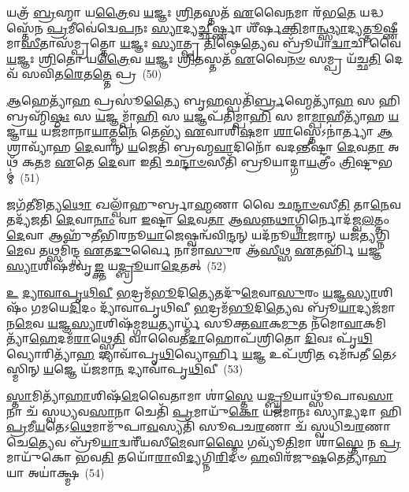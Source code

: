 𑌯𑌤𑍍𑌰᳴ \ul{𑌬𑍍𑌰}\-𑌹𑍍𑌮𑌾 𑌯\-\ul{𑌤𑍍𑌰𑍈}\-𑌵 \ul{𑌯}\-𑌜𑍍𑌞𑌃 \ul{𑌶𑍍𑌰𑌿}\-𑌤𑌸𑍍𑌤𑌤᳴ \ul{𑌏}\-𑌵𑍈\-\ul{𑌨}\-𑌮𑌾 𑌰᳴𑌭\-\ul{𑌤𑍇} 𑌯𑌦𑍍𑌧𑌸𑍍𑌤𑍇᳴𑌨 \ul{𑌪𑍍𑌰}\-𑌮𑍀𑌵𑍇॑𑌦𑍍𑌵𑍇\-\ul{𑌪}\-𑌨𑌃 \ul{𑌸𑍍𑌯𑌾}\-𑌦𑍍𑌯\-\ul{𑌚𑍍𑌛𑍀}\-𑌰𑍍𑌷𑍍𑌣𑌾 𑌶𑍀᳴𑌰𑍍\mbox{}𑌷\-\ul{𑌕𑍍𑌤𑌿}\-𑌮𑌾\-\ul{𑌨𑍍𑌥𑍍𑌸𑍍𑌯𑌾}\-𑌦𑍍𑌯\-\ul{𑌤𑍍𑌤𑍂}\-𑌷𑍍𑌣𑍀𑌮𑌾\-\ul{𑌸𑍀}\-𑌤𑌾𑌸᳴𑌮𑍍𑌪𑍍𑌰𑌤𑍍𑌤𑍋 \ul{𑌯}\-𑌜𑍍𑌞𑌃 \ul{𑌸𑍍𑌯𑌾}\-𑌤𑍍𑌪𑍍𑌰 \ul{𑌤𑌿}\-𑌷𑍍𑌠𑍇\-\ul{𑌤𑍍𑌯𑍇}\-𑌵 𑌬𑍍𑌰𑍂᳴𑌯𑌾\-\ul{𑌦𑍍𑌵𑌾}\-𑌚𑌿 𑌵𑍈 \ul{𑌯}\-𑌜𑍍𑌞𑌃 \ul{𑌶𑍍𑌰𑌿}\-𑌤𑍋 𑌯\-\ul{𑌤𑍍𑌰𑍈}\-𑌵 \ul{𑌯}\-𑌜𑍍𑌞𑌃 \ul{𑌶𑍍𑌰𑌿}\-𑌤𑌸𑍍𑌤𑌤᳴ \ul{𑌏}\-𑌵𑍈\-\ul{𑌨}\-\-\ul{𑍞} 𑌸𑌮𑍍𑌪𑍍𑌰 𑌯᳴𑌚𑍍𑌛\-\ul{𑌤𑌿} 𑌦𑍇𑌵᳴ 𑌸𑌵𑌿𑌤\-\ul{𑌰𑍇}\-𑌤\-\ul{𑌤𑍍𑌤𑍇} 𑌪𑍍𑌰~(50)

\-\ul{𑌆}\-𑌹𑍇𑌤𑍍𑌯𑌾᳴\-\ul{𑌹} 𑌪𑍍𑌰𑌸𑍂॑\-\ul{𑌤𑍍𑌯𑍈} 𑌬𑍃\-\ul{𑌹}\-𑌸𑍍𑌪𑌤𑌿᳴\-\ul{𑌰𑍍𑌬𑍍𑌰}\-𑌹𑍍𑌮𑍇𑌤𑍍𑌯𑌾᳴\-\ul{𑌹} 𑌸 𑌹𑌿 𑌬𑍍𑌰𑌹𑍍𑌮𑌿᳴\-\ul{𑌷𑍍𑌠𑌃} 𑌸 \ul{𑌯}\-𑌜𑍍𑌞𑌮𑍍𑌪𑌾᳴\-\ul{𑌹𑌿} 𑌸 \ul{𑌯}\-𑌜𑍍𑌞𑌪᳴𑌤𑌿𑌮𑍍𑌪𑌾\-\ul{𑌹𑌿} 𑌸 𑌮𑌾\-\ul{𑌮𑍍𑌪𑌾}\-𑌹𑍀𑌤𑍍𑌯𑌾᳴𑌹 \ul{𑌯}\-𑌜𑍍𑌞𑌾\-\ul{𑌯} 𑌯𑌜᳴𑌮𑌾𑌨𑌾\-\ul{𑌯𑌾}\-𑌤𑍍𑌮\-\ul{𑌨𑍇} 𑌤𑍇𑌭𑍍𑌯᳴ \ul{𑌏}\-𑌵𑌾𑌶𑌿\-\ul{𑌷}\-𑌮𑌾 \ul{𑌶𑌾}\-𑌸𑍍𑌤𑍇\-𑌽𑌨𑌾॑𑌰𑍍𑌤𑍍𑌯𑌾 \ul{𑌆}\-𑌶𑍍𑌰𑌾𑌵𑍍𑌯𑌾᳴𑌹 \ul{𑌦𑍇}\-𑌵𑌾𑌨𑍍 \ul{𑌯}\-𑌜𑍇𑌤𑌿᳴ 𑌬𑍍𑌰𑌹𑍍𑌮\-\ul{𑌵𑌾}\-𑌦𑌿𑌨𑍋᳴ 𑌵𑌦\-\ul{𑌨𑍍𑌤𑍀}\-𑌷𑍍𑌟𑌾 \ul{𑌦𑍇}\-𑌵\-\ul{𑌤𑌾} 𑌅𑌥᳴ 𑌕\-\ul{𑌤}\-𑌮 \ul{𑌏}\-𑌤𑍇 \ul{𑌦𑍇}\-𑌵𑌾 𑌇\-\ul{𑌤𑌿} 𑌛\-\ul{𑌨𑍍𑌦𑌾}\-\-\ul{𑍞}\-𑌸𑍀𑌤𑌿᳴ 𑌬𑍍𑌰𑍂𑌯𑌾𑌦𑍍𑌗𑌾\-\ul{𑌯}\-𑌤𑍍𑌰𑍀𑌂 \ul{𑌤𑍍𑌰𑌿}\-𑌷𑍍𑌟𑍁𑌭𑌮𑍍॑~(51)

𑌜𑌗᳴\-\ul{𑌤𑍀}\-𑌮𑌿𑌤𑍍𑌯\-\ul{𑌥𑍋} 𑌖𑌲𑍍𑌵𑌾᳴𑌹𑍁𑌰𑍍𑌬𑍍𑌰𑌾\-\ul{𑌹𑍍𑌮}\-𑌣𑌾 𑌵𑍈 𑌛\-\ul{𑌨𑍍𑌦𑌾}\-\-\ul{𑍞}\-𑌸𑍀\-\ul{𑌤𑌿} 𑌤𑌾\-\ul{𑌨𑍇}\-𑌵 𑌤𑌦𑍍𑌯᳴𑌜𑌤𑌿 \ul{𑌦𑍇}\-𑌵𑌾\-\ul{𑌨𑌾𑌂} 𑌵𑌾 \ul{𑌇}\-𑌷𑍍𑌟𑌾 \ul{𑌦𑍇}\-𑌵\-\ul{𑌤𑌾} 𑌆\-\ul{𑌸}\-𑌨𑍍𑌨\-\ul{𑌥𑌾}\-𑌗𑍍𑌨𑌿𑌰𑍍𑌨𑍋𑌦᳴𑌜𑍍𑌵\-\ul{𑌲}\-𑌤𑍍𑌤𑌂 \ul{𑌦𑍇}\-𑌵𑌾 𑌆𑌹𑍁᳴𑌤𑍀𑌭𑌿𑌰𑌨𑍂\-\ul{𑌯𑌾}\-𑌜𑍇𑌷𑍍𑌵𑌨𑍍𑌵᳴𑌵𑌿\-\ul{𑌨𑍍𑌦}\-𑌨𑍍 𑌯𑌦᳴𑌨𑍂\-\ul{𑌯𑌾}\-𑌜𑌾𑌨𑍍 𑌯𑌜᳴\-\ul{𑌤𑍍𑌯}\-𑌗𑍍𑌨𑌿\-\ul{𑌮𑍇}\-𑌵 𑌤𑌥𑍍𑌸𑌮𑌿᳴𑌨𑍍𑌦𑍍𑌧 \ul{𑌏}\-𑌤\-\ul{𑌦𑍁}\-𑌰𑍍𑌵𑍈 𑌨𑌾𑌮𑌾᳴\-\ul{𑌸𑍁}\-𑌰 𑌆᳴\-\ul{𑌸𑍀}\-𑌥𑍍𑌸 \ul{𑌏}\-𑌤𑌰𑍍\mbox{}𑌹𑌿᳴ \ul{𑌯}\-𑌜𑍍𑌞\-\ul{𑌸𑍍𑌯𑌾}\-𑌶𑌿𑌷᳴𑌮𑌵𑍃\-\ul{𑌙𑍍𑌕𑍍𑌤} 𑌯\-\ul{𑌦𑍍𑌬𑍍𑌰𑍂}\-𑌯𑌾\-\ul{𑌦𑍇}\-𑌤𑌤𑍍~(52)

\-\ul{𑌉} \ul{𑌦𑍍𑌯𑌾}\-\-\ul{𑌵𑌾}\-\-\ul{𑌪𑍃}\-\-\ul{𑌥𑌿}\-\-\ul{𑌵𑍀} \ul{𑌭}\-𑌦𑍍𑌰𑌮᳴\-\ul{𑌭𑍂}\-𑌦𑌿\-\ul{𑌤𑍍𑌯𑍇}\-𑌤𑌦𑍁᳴\-\ul{𑌮𑍇}\-𑌵𑌾\-\ul{𑌸𑍁}\-𑌰𑌂 \ul{𑌯}\-𑌜𑍍𑌞\-\ul{𑌸𑍍𑌯𑌾}\-𑌶𑌿𑌷𑌂᳴ 𑌗𑌮𑌯𑍇\-\ul{𑌦𑌿}\-𑌦𑌂 𑌦𑍍𑌯𑌾᳴𑌵𑌾𑌪𑍃𑌥𑌿𑌵𑍀 \ul{𑌭}\-𑌦𑍍𑌰𑌮᳴\-\ul{𑌭𑍂}\-𑌦𑌿\-\ul{𑌤𑍍𑌯𑍇}\-𑌵 𑌬𑍍𑌰𑍂᳴\-\ul{𑌯𑌾}\-𑌦𑍍𑌯𑌜᳴𑌮𑌾𑌨\-\ul{𑌮𑍇}\-𑌵 \ul{𑌯}\-𑌜𑍍𑌞\-\ul{𑌸𑍍𑌯𑌾}\-𑌶𑌿𑌷᳴𑌮𑍍𑌗𑌮\-\ul{𑌯}\-𑌤𑍍𑌯𑌾𑌰𑍍𑌧𑍍𑌮᳴ 𑌸𑍂𑌕𑍍𑌤\-\ul{𑌵𑌾}\-𑌕\-\ul{𑌮𑍁}\-𑌤 𑌨᳴𑌮𑍋\-\ul{𑌵𑌾}\-𑌕𑌮𑌿𑌤𑍍𑌯𑌾᳴\-\ul{𑌹𑍇}\-𑌦𑌮᳴\-\ul{𑌰𑌾}\-𑌥𑍍𑌸𑍍𑌮𑍇\-\ul{𑌤𑌿} 𑌵𑌾𑌵𑍈𑌤\-\ul{𑌦𑌾}\-𑌹𑍋𑌪᳴𑌶𑍍𑌰𑌿𑌤𑍋 \ul{𑌦𑌿}\-𑌵𑌃 𑌪𑍃᳴\-\ul{𑌥𑌿}\-𑌵𑍍𑌯𑍋𑌰𑌿𑌤𑍍𑌯𑌾᳴\-\ul{𑌹} 𑌦𑍍𑌯𑌾𑌵𑌾᳴𑌪𑍃\-\ul{𑌥𑌿}\-𑌵𑍍𑌯𑍋𑌰𑍍\mbox{}𑌹𑌿 \ul{𑌯}\-𑌜𑍍𑌞 𑌉𑌪᳴𑌶𑍍𑌰𑌿\-\ul{𑌤} 𑌓𑌮᳴𑌨𑍍𑌵𑌤𑍀 \ul{𑌤𑍇}\-\-𑌽𑌸𑍍𑌮𑌿𑌨𑍍 \ul{𑌯}\-𑌜𑍍𑌞𑍇 𑌯᳴𑌜𑌮𑌾\-\ul{𑌨} 𑌦𑍍𑌯𑌾𑌵𑌾᳴𑌪𑍃\-\ul{𑌥𑌿}\-𑌵𑍀~(53)

\-\ul{𑌸𑍍𑌤𑌾}\-𑌮𑌿𑌤𑍍𑌯𑌾᳴\-\ul{𑌹𑌾}\-𑌶𑌿𑌷᳴\-\ul{𑌮𑍇}\-𑌵𑍈𑌤𑌾𑌮𑌾 𑌶𑌾॑\-\ul{𑌸𑍍𑌤𑍇} 𑌯\-\ul{𑌦𑍍𑌬𑍍𑌰𑍂}\-𑌯𑌾𑌥𑍍𑌸𑍂᳴𑌪𑌾𑌵\-\ul{𑌸𑌾}\-𑌨𑌾 𑌚᳴ 𑌸𑍍𑌵𑌧𑍍𑌯𑌵\-\ul{𑌸𑌾}\-𑌨𑌾 𑌚𑍇𑌤𑌿᳴ \ul{𑌪𑍍𑌰}\-𑌮𑌾𑌯𑍁᳴\-\ul{𑌕𑍋} 𑌯𑌜᳴𑌮𑌾𑌨𑌃 𑌸𑍍𑌯𑌾\-\ul{𑌦𑍍𑌯}\-𑌦𑌾 𑌹𑌿 \ul{𑌪𑍍𑌰}\-𑌮𑍀\-\ul{𑌯}\-𑌤𑍇\-𑌽\-\ul{𑌥𑍇}\-𑌮𑌾𑌮𑍁᳴𑌪𑌾\-\ul{𑌵}\-𑌸𑍍𑌯𑌤𑌿᳴ 𑌸𑍂𑌪𑌚\-\ul{𑌰}\-𑌣𑌾 𑌚᳴ 𑌸𑍍𑌵𑌧𑌿𑌚\-\ul{𑌰}\-𑌣𑌾 𑌚𑍇\-\ul{𑌤𑍍𑌯𑍇}\-𑌵 𑌬𑍍𑌰𑍂᳴\-\ul{𑌯𑌾}\-𑌦𑍍𑌵𑌰𑍀᳴𑌯𑌸𑍀\-\ul{𑌮𑍇}\-𑌵𑌾\-\ul{𑌸𑍍𑌮𑍈} 𑌗𑌵𑍍𑌯𑍂᳴\-\ul{𑌤𑌿}\-𑌮𑌾 𑌶𑌾॑\-\ul{𑌸𑍍𑌤𑍇} 𑌨 \ul{𑌪𑍍𑌰}\-𑌮𑌾𑌯𑍁᳴𑌕𑍋 𑌭𑌵\-\ul{𑌤𑌿} 𑌤𑌯𑍋᳴\-\ul{𑌰𑌾}\-𑌵𑌿\-\ul{𑌦𑍍𑌯}\-𑌗𑍍𑌨𑌿\-\ul{𑌰𑌿}\-𑌦𑍞 \ul{𑌹}\-𑌵𑌿𑌰᳴𑌜𑍁\-\ul{𑌷}\-𑌤𑍇𑌤𑍍𑌯𑌾᳴\-\ul{𑌹} 𑌯𑌾 𑌅𑌯𑌾॑𑌕𑍍𑌷𑍍𑌮~(54)

